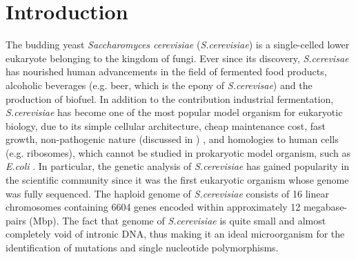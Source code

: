 \documentclass[10pt,a4paper]{article}
\begin{document}
\section*{Introduction}



The budding yeast \textit{Saccharomyces cerevisiae} (\textit{S.cerevisiae}) is a single-celled lower eukaryote belonging to the kingdom of fungi. Ever since its discovery, \textit{S.cerevisae} has nourished human advancements in the field of fermented food products, alcoholic beverages (e.g. beer, which is the epony of \textit{S.cerevisae}) and the production of biofuel. In addition to the contribution industrial fermentation, \textit{S.cerevisiae} has become one of the most popular model organism for eukaryotic biology, due to its simple cellular architecture, cheap maintenance cost, fast growth, non-pathogenic nature (discussed in \cite{perez-torrado_opportunistic_2016}) , and homologies to human cells (e.g. ribosomes), which cannot be studied in prokaryotic model organism, such as \textit{E.coli} \cite{botstein_yeast_2011}. In particular, the genetic analysis of \textit{S.cerevisiae} has gained popularity in the scientific community since it was the first eukaryotic organism whose genome was fully sequenced. The haploid genome of \textit{S.cerevisiae} consists of 16 linear chromosomes containing 6604 genes encoded within approximately 12 megabase-pairs (Mbp)\cite{belda_saccharomyces_2019}. The fact that genome of \textit{S.cerevisiae} is quite small and almost completely void of intronic DNA, thus making it an ideal microorganism for the identification of mutations and single nucleotide polymorphisms.\\
\end{document}
